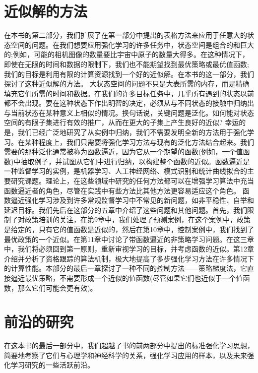 \documentclass[UTF8]{RL}
\begin{document}
\part{近似解的方法}
在本书的第二部分，我们扩展了在第一部分中提出的表格方法来应用于任意大的状态空间的问题。在我们想要应用强化学习的许多任务中，状态空间是组合的和巨大的;例如，可能的相机图像的数量要比宇宙中原子的数量大得多。在这种情况下，即使在无限的时间和数据的限制下，我们也不能期望找到最优策略或最优值函数;我们的目标是利用有限的计算资源找到一个好的近似解。在本书的这一部分，我们探讨了这种近似解的方法。
大状态空间的问题不只是大表所需的内存，而是精确填充它们所需的时间和数据。在我们的许多目标任务中，几乎所有遇到的状态以前都不会出现。要在这种状态下作出明智的决定，必须从与不同状态的接触中归纳出与当前状态在某种意义上相似的情况。换句话说，关键问题是泛化。如何能对状态空间的有限子集进行有效的推广，从而在更大的子集上产生良好的近似?
幸运的是，我们已经广泛地研究了从实例中归纳，我们不需要发明全新的方法用于强化学习。在某种程度上，我们只需要将强化学习方法与现有的泛化方法结合起来。我们需要的那种泛化通常被称为函数逼近，因为它从一个期望的函数(例如，一个值函数)中抽取例子，并试图从它们中进行归纳，以构建整个函数的近似。函数逼近是一种监督学习的实例，是机器学习、人工神经网络、模式识别和统计曲线拟合的主要研究课题。理论上，在这些领域中研究的任何方法都可以在增强学习算法中充当函数逼近者的角色，尽管在实践中有些方法比其他方法更容易适应这个角色。
函数逼近强化学习涉及到许多常规监督学习中不常见的新问题，如非平稳性、自举和延迟目标。我们先后在这部分的五章中介绍了这些问题和其他问题。首先，我们限制了对政策培训的关注，在第9章中，我们处理了预测案例，在这个案例中，政策是给定的，只有它的值函数是近似的，然后在第10章中，控制案例中，我们找到了最优政策的一个近似。在第11章中讨论了带函数逼近的非策略学习问题。在这三章中，我们将必须回到第一原则，重新审视学习的目标，并考虑函数的近似。第12章介绍并分析了资格跟踪的算法机制，极大地提高了多步强化学习方法在许多情况下的计算性能。本部分的最后一章探讨了一种不同的控制方法——策略梯度法，它直接逼近最优策略，不需要形成一个近似的值函数(尽管如果它们也近似于一个值函数，那么它们可能会更有效)。








\part{前沿的研究}
在这本书的最后一部分中，我们超越了书的前两部分中提出的标准强化学习思想，简要地考察了它们与心理学和神经科学的关系，强化学习应用的样本，以及未来强化学习研究的一些活跃前沿。
\end{document}

